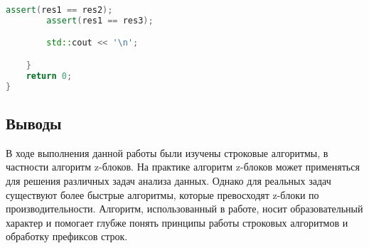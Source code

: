 \documentclass[12pt]{article}
\begin{document}
\begin{lstlisting}[language=C++]
        assert(res1 == res2);
        assert(res1 == res3);

        std::cout << '\n';

    }
    return 0;
}

\end{lstlisting}

\subsection*{Выводы}

В ходе выполнения данной работы были изучены строковые алгоритмы, в частности алгоритм z-блоков. 
На практике алгоритм z-блоков может применяться для решения различных задач анализа данных. Однако для реальных задач существуют более быстрые алгоритмы, которые превосходят z-блоки по производительности. Алгоритм, использованный в работе, носит образовательный характер и помогает глубже понять принципы работы строковых алгоритмов и обработку префиксов строк.
\end{document}
